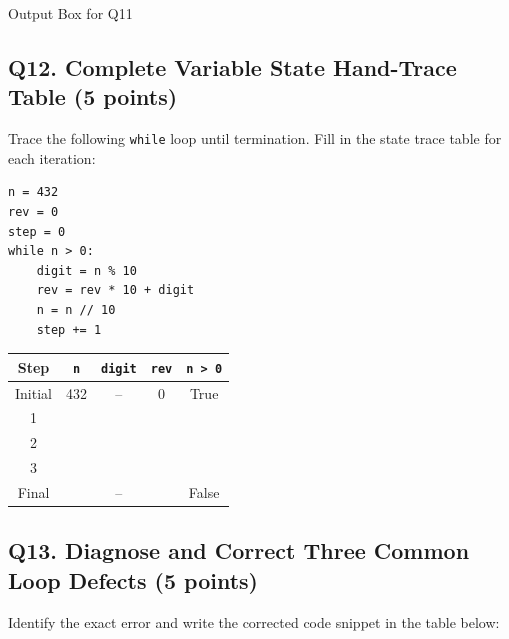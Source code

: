 \documentclass[11pt,a4paper]{article}
\begin{document}
\begin{answerbox}[height=3.4cm]{Output Box for Q11}
\end{answerbox}

\newpage


\subsection*{Q12. Complete Variable State Hand-Trace Table (5 points)}
Trace the following \texttt{while} loop until termination. Fill in the state trace table for each iteration:

\begin{minipage}[t]{0.48\textwidth}
\begin{lstlisting}
n = 432
rev = 0
step = 0
while n > 0:
    digit = n % 10
    rev = rev * 10 + digit
    n = n // 10
    step += 1
\end{lstlisting}
\end{minipage}%
\hfill
\begin{minipage}[t]{0.48\textwidth}
\centering
\small
\begin{tabular}{|c|c|c|c|c|}
\hline
\textbf{Step} & \textbf{\texttt{n}} & \textbf{\texttt{digit}} & \textbf{\texttt{rev}} & \textbf{\texttt{n > 0}} \\
\hline
Initial & 432 & -- & 0 & True \\[1.5mm]
\hline
1 & & & & \\[1.5mm]
\hline
2 & & & & \\[1.5mm]
\hline
3 & & & & \\[1.5mm]
\hline
Final & & -- & & False \\[1.5mm]
\hline
\end{tabular}
\end{minipage}

\vspace{1mm}
\subsection*{Q13. Diagnose and Correct Three Common Loop Defects (5 points)}
Identify the exact error and write the corrected code snippet in the table below:
\end{document}
